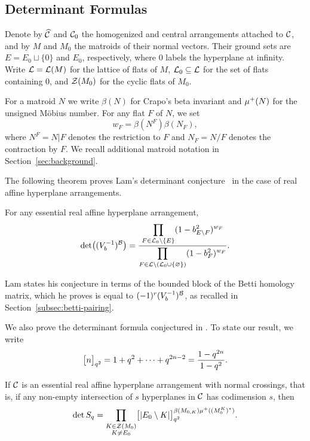 \subsection{Determinant Formulas}
Denote by $\widehat{\mathcal C}$ and $\mathcal C_0$ the homogenized and central
arrangements attached to $\mathcal C$, and by $M$ and $M_0$ the matroids of
their normal vectors. Their ground sets are $E=E_0\sqcup\{0\}$ and
$E_0$, respectively, where $0$ labels the hyperplane at infinity.
Write $\mathcal L = \mathcal L(M)$ for the lattice of flats of $M$, $\mathcal L_0 \subseteq \mathcal L$ for the set of flats containing $0$,
and $\mathcal Z(M_0)$ for the cyclic flats of $M_0$.

For a matroid $N$ we write $\beta(N)$ for Crapo's beta invariant and $\mu^+(N)$ for the unsigned Möbius number.  For any flat $F$ of $N$, we set \[w_F=\beta(N^F)\beta(N_F),\] where $N^F=N|F$ denotes the restriction to $F$ and $N_F=N/F$ denotes the contraction by $F$.  We recall additional matroid notation in Section~\ref{sec:background}.

The following theorem proves Lam's determinant conjecture~\cite[Conjecture 8.10]{Lam} in the case of real affine hyperplane
arrangements.
\begin{theorem}\label{thm:Lam-real}
For any essential real affine hyperplane arrangement,
\begin{equation}\label{eq:Lam-determinant}
 \det\bigl((V_b^{-1})^{\mathcal B}\bigr)
 =\frac{\displaystyle\prod_{F\in\mathcal L_0\setminus\{E\}}
          (1-b_{E\setminus F}^2)^{w_F}}
        {\displaystyle\prod_{F\in\mathcal L\setminus(\mathcal L_0\cup\{\varnothing\})}
          (1-b_F^2)^{w_F}}.
\end{equation}
\end{theorem}

Lam states his conjecture in terms of the bounded block of the Betti homology matrix, which he proves is equal to $(-1)^r(V_b^{-1})^{\mathcal B}$, as recalled in
Section~\ref{subsec:betti-pairing}.

We also prove the determinant formula conjectured in
\cite[Conjecture 1.7]{EM}.  To state our result, we write
\[
 \bigl[n\bigr]_{q^2}=1+q^2+\cdots+q^{2n-2}=\frac{1-q^{2n}}{1-q^2}.
\]


\begin{theorem}\label{thm:intersection-real}
If $\mathcal C$ is an essential real affine hyperplane arrangement with normal crossings, that is, if any non-empty intersection of $s$ hyperplanes in $\mathcal C$ has codimension $s$, then
\begin{equation}\label{eq:Sq-determinant}
 \det S_q
 =\prod_{\substack{K\in\mathcal Z(M_0)\\K\ne E_0}}
   \bigl[|E_0\setminus K|\bigr]_{q^2}^{\beta(M_{0,K})\mu^+((M_0^K)^*)}.
\end{equation}
\end{theorem}

